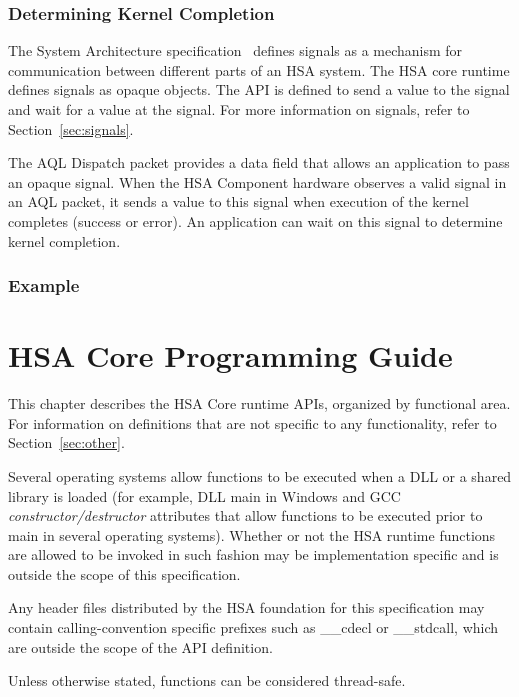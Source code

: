 \documentclass[final]{book}
\begin{document}
\subsection{Determining Kernel Completion}
The System Architecture specification~\cite{sar} defines signals as a mechanism
for communication between different parts of an HSA system. The HSA core runtime
defines signals as opaque objects. The API is defined to send a value to the
signal and wait for a value at the signal. For more information on signals,
refer to Section~\ref{sec:signals}.

The AQL Dispatch packet provides a data field that allows an application to pass
an opaque signal. When the HSA Component hardware observes a valid signal in
an AQL packet, it sends a value to this signal when execution of the kernel
completes (success or error). An application can wait on this signal to determine
kernel completion.

\subsection{Example}


\chapter{HSA Core Programming Guide} \label{coreapi}

This chapter describes the HSA Core runtime APIs, organized by functional
area. For information on definitions that are not specific to any functionality,
refer to Section~\ref{sec:other}.

Several operating systems allow functions to be executed when a DLL or a shared
library is loaded (for example, DLL main in Windows and GCC
\emph{constructor/destructor} attributes that allow functions to be executed
prior to main in several operating systems). Whether or not the HSA runtime
functions are allowed to be invoked in such fashion may be implementation
specific and is outside the scope of this specification.

Any header files distributed by the HSA foundation for this specification may
contain calling-convention specific prefixes such as __cdecl or __stdcall, which
are outside the scope of the API definition.

Unless otherwise stated, functions can be considered thread-safe.
\end{document}
